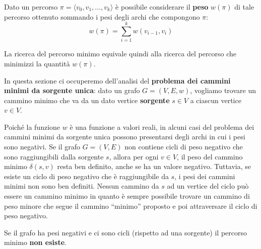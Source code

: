 Dato un percorso $\pi = \langle v_{0},v_{1},\ldots, v_{k} \rangle$ è possibile considerare il \textbf{peso} $w(\pi)$ di tale percorso ottenuto sommando i pesi degli archi che compongono $\pi$:
\begin{equation}
	w(\pi) = \sum_{i=1}^{k} w(v_{i-1},v_{i})
\end{equation}

La ricerca del percorso minimo equivale quindi alla ricerca del percorso che minimizzi la quantità $w(\pi)$.


In questa sezione ci occuperemo dell'analisi del \textbf{problema dei cammini minimi da sorgente unica}: dato un grafo $G=(V,E,w)$, vogliamo trovare un cammino minimo che va da un dato vertice \textbf{sorgente} $s \in V$ a ciascun vertice $v \in V$.

Poiché la funzione $w$ è una funzione a valori reali, in alcuni casi del problema dei cammini minimi da sorgente unica possono presentarsi degli archi in cui i pesi sono negativi. Se il grafo $G=(V,E)$ non contiene cicli di peso negativo che sono raggiungibili dalla sorgente $s$, allora per ogni $v \in V$, il peso del cammino minimo $\delta(s,v)$ resta ben definito, anche se ha un valore negativo. Tuttavia, se esiste un ciclo di peso negativo che è raggiungibile da $s$, i pesi dei cammini minimi non sono ben definiti. Nessun cammino da $s$ ad un vertice del ciclo può essere un cammino minimo in quanto è sempre possibile trovare un cammino di peso minore che segue il cammino ``minimo'' proposto e poi attraversare il ciclo di peso negativo.


\begin{osservation}
		Se il grafo ha pesi negativi e ci sono cicli (rispetto ad una sorgente) il percorso minimo \textbf{non esiste}.
\end{osservation}


